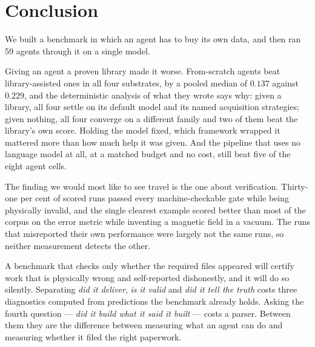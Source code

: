 \section{Conclusion}
\label{sec:conclusion}

We built a benchmark in which an agent has to buy its own data, and then ran 59
agents through it on a single model.

Giving an agent a proven library made it worse. From-scratch agents beat
library-assisted ones in all four substrates, by a pooled median \relltwo{} of
$0.137$ against $0.229$, and the deterministic analysis of what they wrote says
why: given a library, all four settle on its default model and its named
acquisition strategies; given nothing, all four converge on a different family
and two of them beat the library's own score. Holding the model fixed, which
framework wrapped it mattered more than how much help it was given. And the
pipeline that uses no language model at all, at a matched budget and no cost,
still beat five of the eight agent cells.

The finding we would most like to see travel is the one about verification.
Thirty-one per cent of scored runs passed every machine-checkable gate while
being physically invalid, and the single clearest example scored better than
most of the corpus on the error metric while inventing a magnetic field in a
vacuum. The runs that misreported their own performance were largely not the
same runs, so neither measurement detects the other.

A benchmark that checks only whether the required files appeared will certify
work that is physically wrong and self-reported dishonestly, and it will do so
silently. Separating \emph{did it deliver}, \emph{is it valid} and \emph{did it
tell the truth} costs three diagnostics computed from predictions the benchmark
already holds. Asking the fourth question --- \emph{did it build what it said it
built} --- costs a parser. Between them they are the difference between
measuring what an agent can do and measuring whether it filed the right
paperwork.

